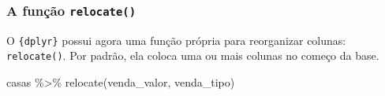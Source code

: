 \documentclass[
]{book}
\newenvironment{Shaded}{\begin{snugshade}}{\end{snugshade}}
\newcommand{\FunctionTok}[1]{\textcolor[rgb]{0.00,0.00,0.00}{#1}}
\newcommand{\NormalTok}[1]{#1}
\newcommand{\SpecialCharTok}[1]{\textcolor[rgb]{0.00,0.00,0.00}{#1}}
\begin{document}
\hypertarget{a-funuxe7uxe3o-relocate}{%
\subsubsection*{\texorpdfstring{A função \texttt{relocate()}}{A função relocate()}}\label{a-funuxe7uxe3o-relocate}}

O \texttt{\{dplyr\}} possui agora uma função própria para reorganizar colunas: \texttt{relocate()}. Por padrão, ela coloca uma ou mais colunas no começo da base.

\begin{Shaded}
\begin{Highlighting}[]
\NormalTok{casas }\SpecialCharTok{\%\textgreater{}\%}
  \FunctionTok{relocate}\NormalTok{(venda\_valor, venda\_tipo)}
\end{Highlighting}
\end{Shaded}
\end{document}

